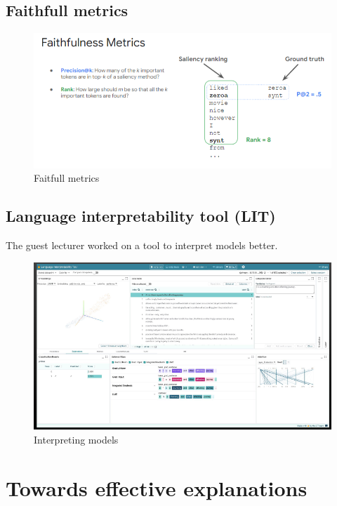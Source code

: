 \documentclass[
  11pt,
  british,
]{article}
\begin{document}
\hypertarget{faithfull-metrics}{%
\subsection{Faithfull metrics}\label{faithfull-metrics}}

\begin{figure}
\centering
\includegraphics{Pasted_image_20220605014258.png}
\caption{Faitfull metrics}
\end{figure}

\hypertarget{language-interpretability-tool-lit}{%
\subsection{Language interpretability tool
(LIT)}\label{language-interpretability-tool-lit}}

The guest lecturer worked on a tool to interpret models better.

\begin{figure}
\centering
\includegraphics{Pasted_image_20220605013925.png}
\caption{Interpreting models}
\end{figure}

\hypertarget{towards-effective-explanations}{%
\section{Towards effective
explanations}\label{towards-effective-explanations}}
\end{document}
